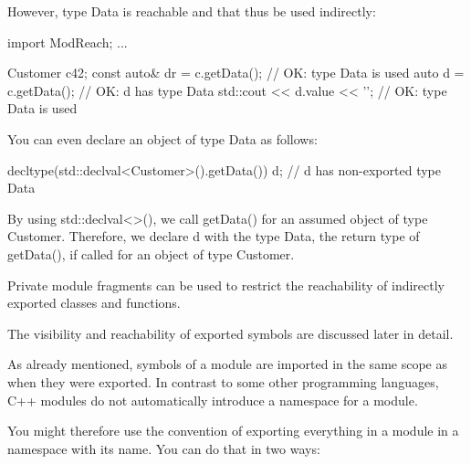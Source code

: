 However, type Data is reachable and that thus be used indirectly:

\begin{cpp}
import ModReach;
...

Customer c{42};
const auto& dr = c.getData(); // OK: type Data is used
auto d = c.getData(); // OK: d has type Data
std::cout << d.value << '\n'; // OK: type Data is used
\end{cpp}

You can even declare an object of type Data as follows:

\begin{cpp}
decltype(std::declval<Customer>().getData()) d; // d has non-exported type Data
\end{cpp}

By using std::declval<>(), we call getData() for an assumed object of type Customer. Therefore, we declare d with the type Data, the return type of getData(), if called for an object of type Customer.

Private module fragments can be used to restrict the reachability of indirectly exported classes and functions.

The visibility and reachability of exported symbols are discussed later in detail.


As already mentioned, symbols of a module are imported in the same scope as when they were exported. In contrast to some other programming languages, C++ modules do not automatically introduce a namespace for a module.

You might therefore use the convention of exporting everything in a module in a namespace with its name. You can do that in two ways:

